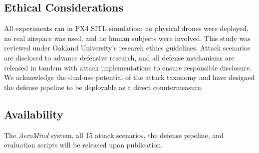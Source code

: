 \documentclass[conference]{IEEEtran}
\begin{document}
\subsection*{Ethical Considerations}
All experiments ran in PX4 SITL simulation; no physical drones were deployed, no real airspace was used, and no human subjects were involved. This study was reviewed under Oakland University's research ethics guidelines. Attack scenarios are disclosed to advance defensive research, and all defense mechanisms are released in tandem with attack implementations to ensure responsible disclosure. We acknowledge the dual-use potential of the attack taxonomy and have designed the defense pipeline to be deployable as a direct countermeasure.

\subsection*{Availability}
The \textit{AeroMind} system, all 15 attack scenarios, the defense pipeline, and evaluation scripts will be released upon publication.



\end{document}
